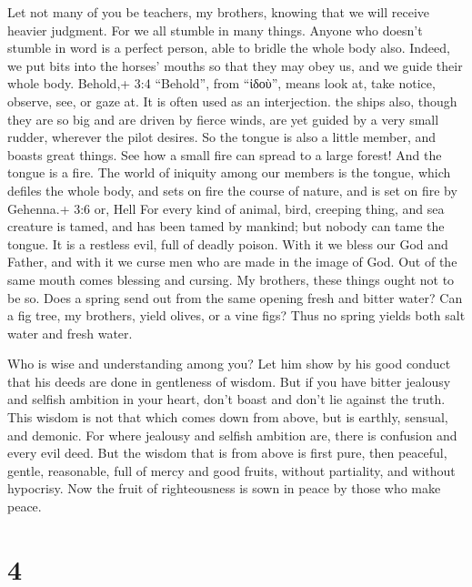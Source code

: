  Let not many of you be teachers, my brothers, knowing that
we will receive heavier judgment.  For we all stumble in
many things. Anyone who doesn't stumble in word is a perfect person,
able to bridle the whole body also.  Indeed, we put bits
into the horses' mouths so that they may obey us, and we guide their
whole body.  Behold,+ 3:4 ``Behold'', from ``ἰδοὺ'', means
look at, take notice, observe, see, or gaze at. It is often used as an
interjection. the ships also, though they are so big and are driven by
fierce winds, are yet guided by a very small rudder, wherever the pilot
desires.  So the tongue is also a little member, and boasts
great things. See how a small fire can spread to a large forest!
 And the tongue is a fire. The world of iniquity among our
members is the tongue, which defiles the whole body, and sets on fire
the course of nature, and is set on fire by Gehenna.+ 3:6 or, Hell
 For every kind of animal, bird, creeping thing, and sea
creature is tamed, and has been tamed by mankind;  but
nobody can tame the tongue. It is a restless evil, full of deadly
poison.  With it we bless our God and Father, and with it we
curse men who are made in the image of God.  Out of the
same mouth comes blessing and cursing. My brothers, these things ought
not to be so.  Does a spring send out from the same opening
fresh and bitter water?  Can a fig tree, my brothers, yield
olives, or a vine figs? Thus no spring yields both salt water and fresh
water.

 Who is wise and understanding among you? Let him show by
his good conduct that his deeds are done in gentleness of wisdom.
 But if you have bitter jealousy and selfish ambition in
your heart, don't boast and don't lie against the truth. 
This wisdom is not that which comes down from above, but is earthly,
sensual, and demonic.  For where jealousy and selfish
ambition are, there is confusion and every evil deed.  But
the wisdom that is from above is first pure, then peaceful, gentle,
reasonable, full of mercy and good fruits, without partiality, and
without hypocrisy.  Now the fruit of righteousness is sown
in peace by those who make peace.

\hypertarget{section-3}{%
\section{4}\label{section-3}}

